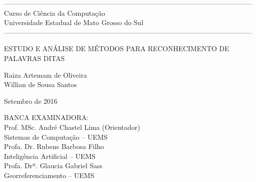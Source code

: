 \thispagestyle{plain}
\begin{center}

------------------------------------------------------------------------------------------------------------
\normalsize{Curso de Ciência da Computação \\ Universidade Estadual de Mato Grosso do Sul}
------------------------------------------------------------------------------------------------------------

\vspace*{2cm}

\LARGE{ESTUDO E ANÁLISE DE MÉTODOS PARA RECONHECIMENTO DE PALAVRAS DITAS}


\vspace*{1.5cm}
\normalsize{Raiza Artemam de Oliveira \\ Willian de Sousa Santos}

\vspace*{1.5cm}

\normalsize{Setembro de 2016}

\vspace*{3cm}
\end{center}
\begin{flushleft}
\begin{minipage}{0.5\textwidth}
\normalsize{
BANCA EXAMINADORA:\\


Prof. MSc. André Chastel Lima (Orientador) \\
Sistemas de Computação – UEMS\\



Profa. Dr.  Rubens Barbosa Filho \\
Inteligência Artificial – UEMS\\


 Profa. Drª.  Glaucia Gabriel Sass \\
Georreferenciamento – UEMS 
}
\end{minipage}
\end{flushleft}

